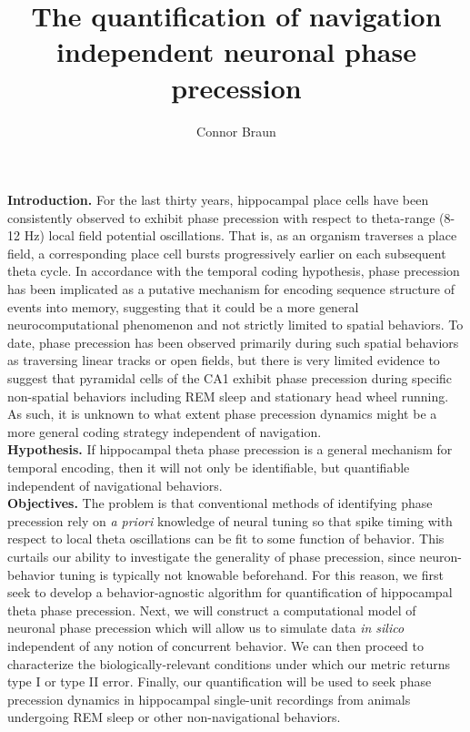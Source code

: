 \documentclass[11pt, letterpaper]{article}
\title{The quantification of navigation independent neuronal phase precession}
\author{Connor Braun}
\date{\vspace{-5ex}}
\begin{document}
\maketitle
\fontsize{12}{12}\selectfont
{}

{\bf Introduction.} For the last thirty years, hippocampal place cells have been consistently observed to exhibit phase 
precession with respect to theta-range (8-12 Hz) local field potential oscillations. 
That is, as an organism traverses a place field, a corresponding place cell bursts progressively earlier
on each subsequent theta cycle. 
In accordance with the temporal coding hypothesis, phase precession has been implicated as a putative 
mechanism for encoding sequence structure of events into memory, suggesting that it could be a more 
general neurocomputational phenomenon and not strictly limited to spatial behaviors. To date, phase precession has been observed primarily during such spatial behaviors as traversing linear tracks or 
open fields, but there is very limited evidence to suggest that pyramidal cells of the CA1 exhibit phase precession 
during specific non-spatial behaviors including REM sleep and stationary head wheel running. As such, 
it is unknown to what extent phase precession dynamics might be a more general coding strategy independent of navigation.
\\

{\bf Hypothesis.} If hippocampal theta phase precession is a general mechanism for temporal encoding, then it will not only
be identifiable, but quantifiable independent of navigational behaviors.\\

{\bf Objectives.} The problem is that conventional methods of identifying phase precession rely on {\it a priori} knowledge of neural tuning so that spike timing
with respect to local theta oscillations can be fit to some function of behavior.
This curtails our ability to investigate the generality of phase precession, since neuron-behavior tuning
is typically not knowable beforehand. For this reason, we first seek to develop a behavior-agnostic algorithm 
for quantification of hippocampal theta phase precession. Next, we will construct a computational model of neuronal phase precession 
which will allow us to simulate data {\it in silico} independent of any notion of concurrent behavior. We can then proceed to characterize 
the biologically-relevant conditions under which our metric returns type I or type II error. Finally, our quantification will be used
to seek phase precession dynamics in hippocampal single-unit recordings from animals undergoing REM sleep or other
non-navigational behaviors. \\
\end{document}
